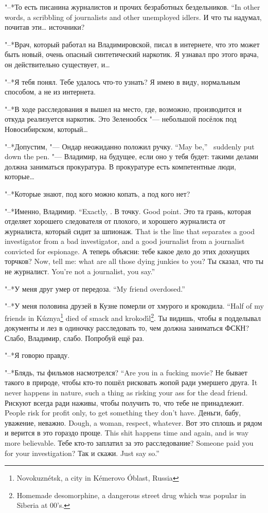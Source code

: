 {"--*То есть писанина журналистов и прочих безработных бездельников.}
{``In other words, a scribbling of journalists and other unemployed idlers.}
И что ты надумал, почитав эти\ldots{} источники?

"--*Врач, который работал на Владимировской, писал в интернете, что это может быть новый, очень опасный синтетический наркотик.
Я узнавал про этого врача, он действительно существует, и\ldots{}

"--*Я тебя понял.
Тебе удалось что-то узнать?
Я имею в виду, нормальным способом, а не из интернета.

"--*В ходе расследования я вышел на место, где, возможно, производится и откуда реализуется наркотик.
Это Зеленообск "--- небольшой посёлок под Новосибирском, который\ldots{}

{"--*Допустим, "--- Ондар неожиданно положил ручку.}
{``May be,'' \Ondar\ suddenly put down the pen.}
"--- Владимир, на будущее, если оно у тебя будет: такими делами должна заниматься прокуратура.
В прокуратуре есть компетентные люди, которые\ldots{}

"--*Которые знают, под кого можно копать, а под кого нет?

{"--*Именно, Владимир.}
{``Exactly, \Vladimir.}
{В точку.}
{Good point.}
{Это та грань, которая отделяет хорошего следователя от плохого, и хорошего журналиста от журналиста, который сидит за шпионаж.}
{That is the line that separates a good investigator from a bad investigator, and a good journalist from a journalist convicted for espionage.}
{А теперь объясни: тебе какое дело до этих дохнущих торчков?}
{Now, tell me: what are all those dying junkies to you?}
{Ты сказал, что ты не журналист.}
{You're not a journalist, you say.''}

{"--*У меня друг умер от передоза.}
{``My friend overdosed.''}

{"--*У меня половина друзей в Кузне померли от хмурого и крокодила.}
{``Half of my friends in K\'uznya\footnote{Novokuzn\'etsk, a city in K\'emerovo \'Oblast, Russia} died of smack and krokod\'{\i}l\footnote{Homemade desomorphine, a dangerous street drug which was popular in Siberia at 00's.}.}
Ты видишь, чтобы я подделывал документы и лез в одиночку расследовать то, чем должна заниматься ФСКН?
Слабо, Владимир, слабо.
Попробуй ещё раз.

"--*Я говорю правду.

{"--*Блядь, ты фильмов насмотрелся?}
{``Are you in a fucking movie?}
{Не бывает такого в природе, чтобы кто-то пошёл рисковать жопой ради умершего друга.}
{It never happens in nature, such a thing as risking your ass for the dead friend.}
{Рискуют всегда ради наживы, чтобы получить то, что тебе не принадлежит.}
{People risk for profit only, to get something they don't have.}
{Деньги, бабу, уважение, неважно.}
{Dough, a woman, respect, whatever.}
{Вот это сплошь и рядом и верится в это гораздо проще.}
{This shit happens time and again, and is way more believable.}
{Тебе кто-то заплатил за это расследование?}
{Someone paid you for your investigation?}
{Так и скажи.}
{Just say so.''}

